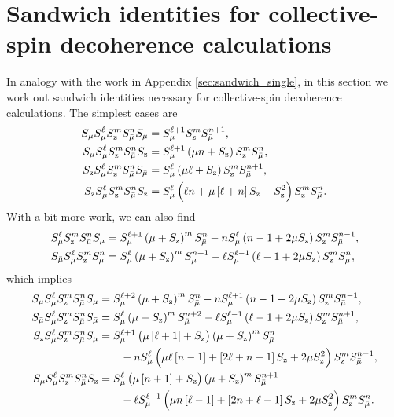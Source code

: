 \documentclass[aps,notitlepage,nofootinbib,11pt]{revtex4-1}
\newcommand{\p}[1]{\left(#1\right)} %
\renewcommand{\sp}[1]{\left[#1\right]} %
\newcommand{\z}{\text{z}}
\newcommand{\bmu}{{\bar\mu}}
\newcommand{\1}{\mathds{1}}
\begin{document}
\section{Sandwich identities for collective-spin decoherence
  calculations}
\label{sec:sandwich_collective}

In analogy with the work in Appendix \ref{sec:sandwich_single}, in
this section we work out sandwich identities necessary for
collective-spin decoherence calculations.  The simplest cases are
\begin{align}
  S_\mu S_\mu^\ell S_\z^m S_\bmu^n S_\bmu
  &= S_\mu^{\ell+1} S_\z^m S_\bmu^{n+1},
  \allowdisplaybreaks \\
  S_\mu S_\mu^\ell S_\z^m S_\bmu^n S_\z
  &= S_\mu^{\ell+1} \p{\mu n+S_\z} S_\z^m S_\bmu^n,
  \allowdisplaybreaks \\
  S_\z S_\mu^\ell S_\z^m S_\bmu^n S_\bmu
  &= S_\mu^\ell \p{\mu\ell+S_\z} S_\z^m S_\bmu^{n+1},
  \allowdisplaybreaks \\
  S_\z S_\mu^\ell S_\z^m S_\bmu^n S_\z
  &= S_\mu^\ell \p{\ell n + \mu\sp{\ell+n} S_\z + S_\z^2}
  S_\z^m S_\bmu^n.
\end{align}
With a bit more work, we can also find
\begin{align}
  S_\mu^\ell S_\z^m S_\bmu^n S_\mu
  &= S_\mu^{\ell+1} \p{\mu+S_\z}^m S_\bmu^n
  - n S_\mu^\ell \p{n-1+2\mu S_\z} S_\z^m S_\bmu^{n-1},
  \allowdisplaybreaks \\
  S_\bmu S_\mu^\ell S_\z^m S_\bmu^n
  &= S_\mu^\ell \p{\mu+S_\z}^m S_\bmu^{n+1}
  - \ell S_\mu^{\ell-1} \p{\ell-1+2\mu S_\z} S_\z^m S_\bmu^n,
\end{align}
which implies
\begin{align}
  S_\mu S_\mu^\ell S_\z^m S_\bmu^n S_\mu
  &= S_\mu^{\ell+2} \p{\mu+S_\z}^m S_\bmu^n
  - n S_\mu^{\ell+1} \p{n-1+2\mu S_\z} S_\z^m S_\bmu^{n-1},
  \allowdisplaybreaks \\
  S_\bmu S_\mu^\ell S_\z^m S_\bmu^n S_\bmu
  &= S_\mu^\ell \p{\mu+S_\z}^m S_\bmu^{n+2}
  - \ell S_\mu^{\ell-1} \p{\ell-1+2\mu S_\z} S_\z^m S_\bmu^{n+1},
  \allowdisplaybreaks \\
  S_\z S_\mu^\ell S_\z^m S_\bmu^n S_\mu
  &= S_\mu^{\ell+1} \p{\mu\sp{\ell+1}+S_\z} \p{\mu+S_\z}^m S_\bmu^n
  \notag \\
  &\qquad - n S_\mu^\ell
  \p{\mu\ell\sp{n-1} + \sp{2\ell+n-1}S_\z + 2\mu S_\z^2}
  S_\z^m S_\bmu^{n-1},
  \allowdisplaybreaks \\
  S_\bmu S_\mu^\ell S_\z^m S_\bmu^n S_\z
  &= S_\mu^\ell \p{\mu\sp{n+1}+S_\z} \p{\mu+S_\z}^m S_\bmu^{n+1}
  \notag \\
  &\qquad - \ell S_\mu^{\ell-1}
  \p{\mu n\sp{\ell-1} + \sp{2n+\ell-1}S_\z + 2\mu S_\z^2}
  S_\z^m S_\bmu^n.
\end{align}
\end{document}
